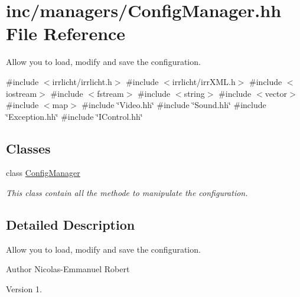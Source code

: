 \hypertarget{ConfigManager_8hh}{}\section{inc/managers/\+Config\+Manager.hh File Reference}
\label{ConfigManager_8hh}


Allow you to load, modify and save the configuration.  


{\ttfamily \#include $<$irrlicht/irrlicht.\+h$>$}\newline
{\ttfamily \#include $<$irrlicht/irr\+X\+M\+L.\+h$>$}\newline
{\ttfamily \#include $<$iostream$>$}\newline
{\ttfamily \#include $<$fstream$>$}\newline
{\ttfamily \#include $<$string$>$}\newline
{\ttfamily \#include $<$vector$>$}\newline
{\ttfamily \#include $<$map$>$}\newline
{\ttfamily \#include \char`\"{}Video.\+hh\char`\"{}}\newline
{\ttfamily \#include \char`\"{}Sound.\+hh\char`\"{}}\newline
{\ttfamily \#include \char`\"{}Exception.\+hh\char`\"{}}\newline
{\ttfamily \#include \char`\"{}I\+Control.\+hh\char`\"{}}\newline
\subsection*{Classes}
\begin{DoxyCompactItemize}
\item 
class \hyperlink{classConfigManager}{Config\+Manager}
\begin{DoxyCompactList}\small\item\em This class contain all the methode to manipulate the configuration. \end{DoxyCompactList}\end{DoxyCompactItemize}


\subsection{Detailed Description}
Allow you to load, modify and save the configuration. 

\begin{DoxyAuthor}{Author}
Nicolas-\/\+Emmanuel Robert 
\end{DoxyAuthor}
\begin{DoxyVersion}{Version}
1. 
\end{DoxyVersion}
